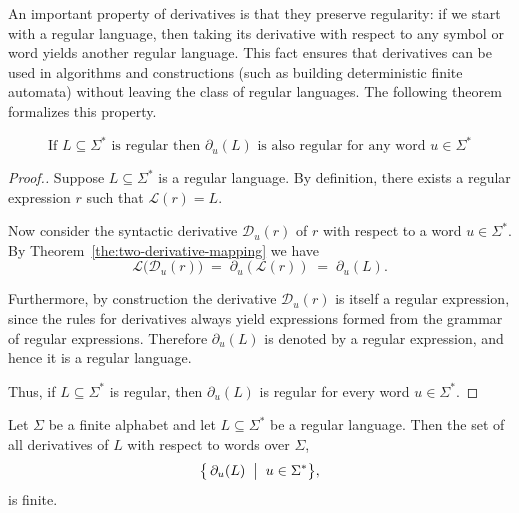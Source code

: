 \noindent
An important property of derivatives is that they preserve regularity: if we start with a regular language, then taking its derivative with respect to any symbol or word yields another regular language. This fact ensures that derivatives can be used in algorithms and constructions (such as building deterministic finite automata) without leaving the class of regular languages. The following theorem formalizes this property.


\begin{theorem}\label{the:language-derivative-regular}
    $$\text{If }L\subseteq\Sigma^* \text{ is regular then } \partial_u(L) \text{ is also regular for any word } u\in\Sigma^*$$
\end{theorem}

\begin{proof}[Proof.]
Suppose $L \subseteq \Sigma^*$ is a regular language.  
By definition, there exists a regular expression $r$ such that 
$\mathcal{L}(r) = L$.

Now consider the syntactic derivative $\mathcal{D}_u(r)$ of $r$ with respect to 
a word $u \in \Sigma^*$.  
By Theorem~\ref{the:two-derivative-mapping} we have
\[
   \mathcal{L}\bigl(\mathcal{D}_u(r)\bigr)
   \;=\;
   \partial_u(\mathcal{L}(r))
   \;=\;
   \partial_u(L).
\]

Furthermore, by construction the derivative $\mathcal{D}_u(r)$ is itself a
regular expression, since the rules for derivatives always yield expressions
formed from the grammar of regular expressions.  
Therefore $\partial_u(L)$ is denoted by a regular expression, and hence it is a
regular language.

Thus, if $L \subseteq \Sigma^*$ is regular, then $\partial_u(L)$ is regular for
every word $u \in \Sigma^*$.
\end{proof}

\begin{theorem}\label{the:derivative-set-is-finite}
    Let $\Sigma$ be a finite alphabet and let $L \subseteq \Sigma^*$ be a regular language.
    Then the set of all derivatives of $L$ with respect to words over $\Sigma$,
    \[
        \bigl\{\, \partial_{u}(L) \;\bigm|\; u \in \Sigma^* \bigr\},
    \]
    is finite.
\end{theorem}


